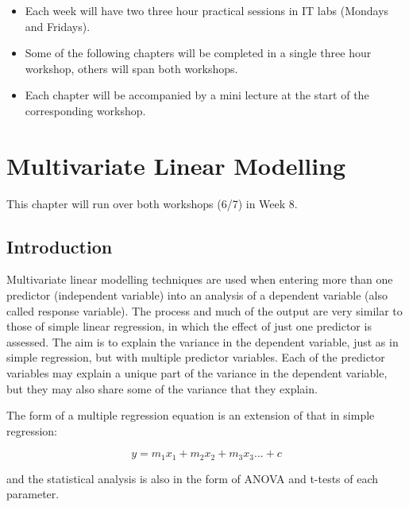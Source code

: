 \documentclass[
]{book}
\providecommand{\tightlist}{%
  \setlength{\itemsep}{0pt}\setlength{\parskip}{0pt}}
\begin{document}
\begin{itemize}
\tightlist
\item
  Each week will have two three hour practical sessions in IT labs (Mondays and Fridays).
\item
  Some of the following chapters will be completed in a single three hour workshop, others will span both workshops.
\item
  Each chapter will be accompanied by a mini lecture at the start of the corresponding workshop.
\end{itemize}

\hypertarget{multivariate-linear-modelling}{%
\chapter{Multivariate Linear Modelling}\label{multivariate-linear-modelling}}

This chapter will run over both workshops (6/7) in Week 8.

\hypertarget{introduction-5}{%
\section{Introduction}\label{introduction-5}}

Multivariate linear modelling techniques are used when entering more than one predictor (independent variable) into an analysis of a dependent variable (also called response variable). The process and much of the output are very similar to those of simple linear regression, in which the effect of just one predictor is assessed. The aim is to explain the variance in the dependent variable, just as in simple regression, but with multiple predictor variables. Each of the predictor variables may explain a unique part of the variance in the dependent variable, but they may also share some of the variance that they explain.

The form of a multiple regression equation is an extension of that in simple regression:

\[
y = m_1x_1+m_2x_2+m_3x_3...+c
\]

and the statistical analysis is also in the form of ANOVA and t-tests of each parameter.
\end{document}
